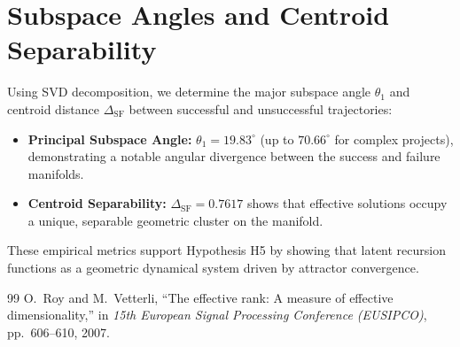 \documentclass[a4paper, 12pt]{report}
\begin{document}
\section{Subspace Angles and Centroid Separability}
Using SVD decomposition, we determine the major subspace angle $\theta_1$ and centroid distance $\Delta_{\text{SF}}$ between successful and unsuccessful trajectories:
\begin{itemize}
    \item \textbf{Principal Subspace Angle:} $\theta_1 = 19.83^\circ$ (up to $70.66^\circ$ for complex projects), demonstrating a notable angular divergence between the success and failure manifolds.
    \item \textbf{Centroid Separability:} $\Delta_{\text{SF}} = 0.7617$ shows that effective solutions occupy a unique, separable geometric cluster on the manifold.
\end{itemize}
These empirical metrics support Hypothesis H5 by showing that latent recursion functions as a geometric dynamical system driven by attractor convergence.

\ifdefined\isincluded
\else
\begin{thebibliography}{99}
 O.~Roy and M.~Vetterli, ``The effective rank: A measure of effective dimensionality,'' in \emph{15th European Signal Processing Conference (EUSIPCO)}, pp.~606--610, 2007.
\end{thebibliography}
\end{document}
